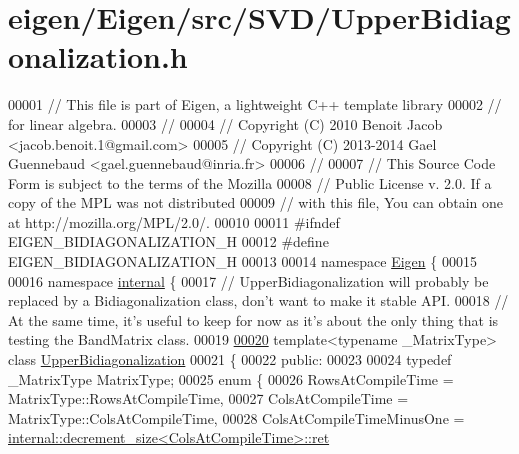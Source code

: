 \hypertarget{eigen_2_eigen_2src_2_s_v_d_2_upper_bidiagonalization_8h_source}{}\section{eigen/\+Eigen/src/\+S\+V\+D/\+Upper\+Bidiagonalization.h}
\label{eigen_2_eigen_2src_2_s_v_d_2_upper_bidiagonalization_8h_source}

\begin{DoxyCode}
00001 \textcolor{comment}{// This file is part of Eigen, a lightweight C++ template library}
00002 \textcolor{comment}{// for linear algebra.}
00003 \textcolor{comment}{//}
00004 \textcolor{comment}{// Copyright (C) 2010 Benoit Jacob <jacob.benoit.1@gmail.com>}
00005 \textcolor{comment}{// Copyright (C) 2013-2014 Gael Guennebaud <gael.guennebaud@inria.fr>}
00006 \textcolor{comment}{//}
00007 \textcolor{comment}{// This Source Code Form is subject to the terms of the Mozilla}
00008 \textcolor{comment}{// Public License v. 2.0. If a copy of the MPL was not distributed}
00009 \textcolor{comment}{// with this file, You can obtain one at http://mozilla.org/MPL/2.0/.}
00010 
00011 \textcolor{preprocessor}{#ifndef EIGEN\_BIDIAGONALIZATION\_H}
00012 \textcolor{preprocessor}{#define EIGEN\_BIDIAGONALIZATION\_H}
00013 
00014 \textcolor{keyword}{namespace }\hyperlink{namespace_eigen}{Eigen} \{ 
00015 
00016 \textcolor{keyword}{namespace }\hyperlink{namespaceinternal}{internal} \{
00017 \textcolor{comment}{// UpperBidiagonalization will probably be replaced by a Bidiagonalization class, don't want to make it
       stable API.}
00018 \textcolor{comment}{// At the same time, it's useful to keep for now as it's about the only thing that is testing the
       BandMatrix class.}
00019 
\hyperlink{class_eigen_1_1internal_1_1_upper_bidiagonalization}{00020} \textcolor{keyword}{template}<\textcolor{keyword}{typename} \_MatrixType> \textcolor{keyword}{class }\hyperlink{class_eigen_1_1internal_1_1_upper_bidiagonalization}{UpperBidiagonalization}
00021 \{
00022   \textcolor{keyword}{public}:
00023 
00024     \textcolor{keyword}{typedef} \_MatrixType MatrixType;
00025     \textcolor{keyword}{enum} \{
00026       RowsAtCompileTime = MatrixType::RowsAtCompileTime,
00027       ColsAtCompileTime = MatrixType::ColsAtCompileTime,
00028       ColsAtCompileTimeMinusOne = 
      \hyperlink{struct_eigen_1_1internal_1_1decrement__size}{internal::decrement\_size<ColsAtCompileTime>::ret}

\end{DoxyCode}
